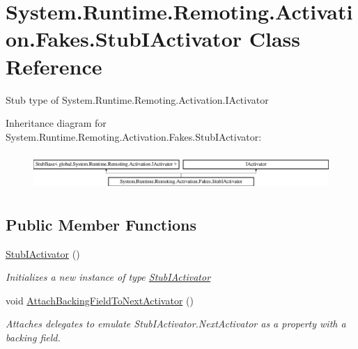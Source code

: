\hypertarget{class_system_1_1_runtime_1_1_remoting_1_1_activation_1_1_fakes_1_1_stub_i_activator}{\section{System.\-Runtime.\-Remoting.\-Activation.\-Fakes.\-Stub\-I\-Activator Class Reference}
\label{class_system_1_1_runtime_1_1_remoting_1_1_activation_1_1_fakes_1_1_stub_i_activator}
}


Stub type of System.\-Runtime.\-Remoting.\-Activation.\-I\-Activator 


Inheritance diagram for System.\-Runtime.\-Remoting.\-Activation.\-Fakes.\-Stub\-I\-Activator\-:\begin{figure}[H]
\begin{center}
\leavevmode
\includegraphics[height=1.414141cm]{class_system_1_1_runtime_1_1_remoting_1_1_activation_1_1_fakes_1_1_stub_i_activator}
\end{center}
\end{figure}
\subsection*{Public Member Functions}
\begin{DoxyCompactItemize}
\item 
\hyperlink{class_system_1_1_runtime_1_1_remoting_1_1_activation_1_1_fakes_1_1_stub_i_activator_acbd2006484d61134d30f947af1954ec9}{Stub\-I\-Activator} ()
\begin{DoxyCompactList}\small\item\em Initializes a new instance of type \hyperlink{class_system_1_1_runtime_1_1_remoting_1_1_activation_1_1_fakes_1_1_stub_i_activator}{Stub\-I\-Activator}\end{DoxyCompactList}\item 
void \hyperlink{class_system_1_1_runtime_1_1_remoting_1_1_activation_1_1_fakes_1_1_stub_i_activator_ac45ce3f9527436ea99225178ebd0d8e2}{Attach\-Backing\-Field\-To\-Next\-Activator} ()
\begin{DoxyCompactList}\small\item\em Attaches delegates to emulate Stub\-I\-Activator.\-Next\-Activator as a property with a backing field.\end{DoxyCompactList}\end{DoxyCompactItemize}
